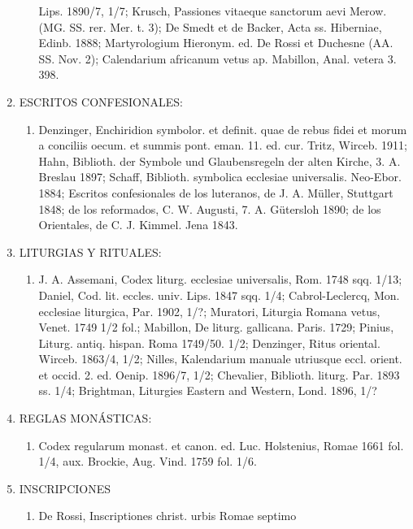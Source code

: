 \raggedbottom{} \documentclass[12pt, a4paper]{book}
\begin{document}
\begin{enumerate}
\begin{enumerate}
                Lips. 1890/7, 1/7; Krusch, Passiones vitaeque sanctorum aevi Merow. (MG.
                SS. rer. Mer. t. 3); De Smedt et de Backer, Acta ss. Hiberniae, Edinb.
                1888; Martyrologium Hieronym. ed. De Rossi et Duchesne (AA. SS. Nov. 2);
                Calendarium africanum vetus ap. Mabillon, Anal. vetera 3. 398.
        \end{enumerate}
  \item ESCRITOS CONFESIONALES: \begin{enumerate}
          \item Denzinger, Enchiridion symbolor. et
                definit. quae de rebus fidei et morum a conciliis oecum. et summis pont.
                eman. 11. ed. cur. Tritz, Wirceb. 1911; Hahn, Biblioth. der Symbole und
                Glaubensregeln der alten Kirche, 3. A. Breslau 1897; Schaff, Biblioth. symbolica ecclesiae universalis. Neo-Ebor. 1884; Escritos confesionales de los
                luteranos, de J. A. Müller, Stuttgart 1848; de los reformados, C. W. Augusti, 7. A. Gütersloh 1890; de los Orientales, de C. J. Kimmel. Jena 1843.
        \end{enumerate}
  \item LITURGIAS Y RITUALES: \begin{enumerate}
          \item J. A. Assemani, Codex liturg. ecclesiae
                universalis, Rom. 1748 sqq. 1/13; Daniel, Cod. lit. eccles. univ. Lips. 1847
                sqq. 1/4; Cabrol-Leclercq, Mon. ecclesiae liturgica, Par. 1902, 1/?; Muratori, Liturgia Romana vetus, Venet. 1749 1/2 fol.; Mabillon, De liturg. gallicana. Paris. 1729; Pinius, Liturg. antiq. hispan. Roma 1749/50. 1/2; Denzinger, Ritus oriental. Wirceb. 1863/4, 1/2; Nilles, Kalendarium manuale
                utriusque eccl. orient. et occid. 2. ed. Oenip. 1896/7, 1/2; Chevalier, Biblioth. liturg. Par. 1893 ss. 1/4; Brightman, Liturgies Eastern and Western,
                Lond. 1896, 1/?
        \end{enumerate}
  \item REGLAS MONÁSTICAS: \begin{enumerate}
          \item Codex regularum monast. et canon. ed. Luc.
                Holstenius, Romae 1661 fol. 1/4, aux. Brockie, Aug. Vind. 1759 fol. 1/6.
        \end{enumerate}
  \item INSCRIPCIONES \begin{enumerate}
          \item De Rossi, Inscriptiones christ. urbis Romae septimo

\end{enumerate}
\end{enumerate}
\end{document}
